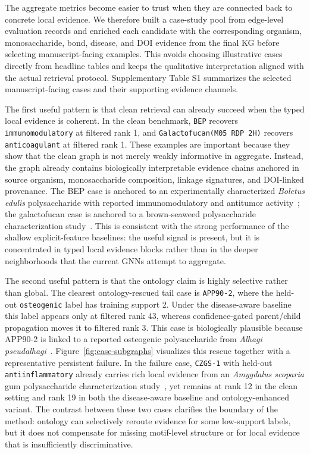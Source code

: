 \documentclass[11pt]{article}
\begin{document}
The aggregate metrics become easier to trust when they are connected back to concrete local evidence. We therefore built a case-study pool from edge-level evaluation records and enriched each candidate with the corresponding organism, monosaccharide, bond, disease, and DOI evidence from the final KG before selecting manuscript-facing examples. This avoids choosing illustrative cases directly from headline tables and keeps the qualitative interpretation aligned with the actual retrieval protocol. Supplementary Table S1 summarizes the selected manuscript-facing cases and their supporting evidence channels.

The first useful pattern is that clean retrieval can already succeed when the typed local evidence is coherent. In the clean benchmark, \texttt{BEP} recovers \texttt{immunomodulatory} at filtered rank 1, and \texttt{Galactofucan(M05 RDP 2H)} recovers \texttt{anticoagulant} at filtered rank 1. These examples are important because they show that the clean graph is not merely weakly informative in aggregate. Instead, the graph already contains biologically interpretable evidence chains anchored in source organism, monosaccharide composition, linkage signatures, and DOI-linked provenance. The BEP case is anchored to an experimentally characterized \textit{Boletus edulis} polysaccharide with reported immunomodulatory and antitumor activity~\cite{wang2014boletus}; the galactofucan case is anchored to a brown-seaweed polysaccharide characterization study~\cite{rioux2010galactofucan}. This is consistent with the strong performance of the shallow explicit-feature baselines: the useful signal is present, but it is concentrated in typed local evidence blocks rather than in the deeper neighborhoods that the current GNNs attempt to aggregate.

The second useful pattern is that the ontology claim is highly selective rather than global. The clearest ontology-rescued tail case is \texttt{APP90-2}, where the held-out \texttt{osteogenic} label has training support 2. Under the disease-aware baseline this label appears only at filtered rank 43, whereas confidence-gated parent/child propagation moves it to filtered rank 3. This case is biologically plausible because APP90-2 is linked to a reported osteogenic polysaccharide from \textit{Alhagi pseudalhagi}~\cite{ye2021app90}. Figure~\ref{fig:case-subgraphs} visualizes this rescue together with a representative persistent failure. In the failure case, \texttt{CZGS-1} with held-out \texttt{antiinflammatory} already carries rich local evidence from an \textit{Amygdalus scoparia} gum polysaccharide characterization study~\cite{molaei2018czgs}, yet remains at rank 12 in the clean setting and rank 19 in both the disease-aware baseline and ontology-enhanced variant. The contrast between these two cases clarifies the boundary of the method: ontology can selectively reroute evidence for some low-support labels, but it does not compensate for missing motif-level structure or for local evidence that is insufficiently discriminative.
\end{document}
